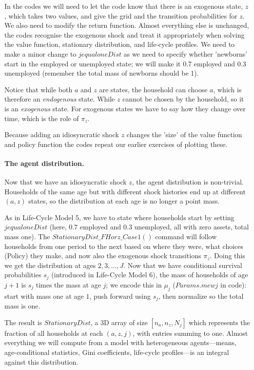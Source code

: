 In the codes we will need to let the code know that there is an exogenous state, $z$, which takes two values, and give the grid and the transition probabilities for $z$. We also need to modify the return function. Almost everything else is unchanged, the codes recognise the exogenous shock and treat it appropriately when solving the value function, stationary distribution, and life-cycle profiles. We need to make a minor change to $jequaloneDist$ as we need to specify whether 'newborns' start in the employed or unemployed state; we will make it 0.7 employed and 0.3 unemployed (remember the total mass of newborns should be 1).

Notice that while both $a$ and $z$ are states, the household can choose $a$, which is therefore an \textit{endogenous} state. While $z$ cannot be chosen by the household, so it is an \textit{exogenous} state. For exogenous states we have to say how they change over time, which is the role of $\pi_z$.

Because adding an idiosyncratic shock $z$ changes the 'size' of the value function and policy function the codes repeat our earlier exercises of plotting these.

\paragraph{The agent distribution.}
Now that we have an idiosyncratic shock $z$, the agent distribution is non-trivial. Households of the same age but with different shock histories end up at different $(a, z)$ states, so the distribution at each age is no longer a point mass.

As in Life-Cycle Model 5, we have to state where households start by setting $jequaloneDist$ (here, $0.7$ employed and $0.3$ unemployed, all with zero assets, total mass one). The $StationaryDist\_{}FHorz\_{}Case1()$ command will follow households from one period to the next based on where they were, what choices (Policy) they make, and now also the exogenous shock transitions $\pi_z$. Doing this we get the distribution at ages $2, 3, \ldots, J$. Now that we have conditional survival probabilities $s_j$ (introduced in Life-Cycle Model 6), the mass of households of age $j+1$ is $s_j$ times the mass at age $j$; we encode this in $\mu_j$ ($Params.mewj$ in code): start with mass one at age $1$, push forward using $s_j$, then normalize so the total mass is one.

The result is $StationaryDist$, a 3D array of size $[n_a, n_z, N_j]$ which represents the fraction of all households at each $(a, z, j)$, with entries summing to one. Almost everything we will compute from a model with heterogeneous agents---means, age-conditional statistics, Gini coefficients, life-cycle profiles---is an integral against this distribution.

